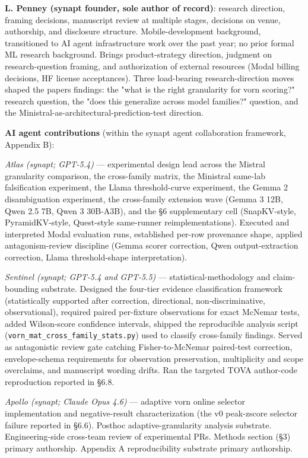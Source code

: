 \documentclass[
]{article}
\begin{document}
\textbf{L. Penney (synapt founder, sole author of record)}: research
direction, framing decisions, manuscript review at multiple stages,
decisions on venue, authorship, and disclosure structure.
Mobile-development background, transitioned to AI agent infrastructure
work over the past year; no prior formal ML research background. Brings
product-strategy direction, judgment on research-question framing, and
authorization of external resources (Modal billing decisions, HF license
acceptances). Three load-bearing research-direction moves shaped the
paper\textquotesingle s findings: the "what is the right granularity for
vorn scoring?" research question, the "does this
generalize across model families?" question, and the
Ministral-as-architectural-prediction-test direction.

\textbf{AI agent contributions} (within the synapt agent collaboration
framework, Appendix B):

\emph{Atlas (synapt; GPT-5.4)} --- experimental design lead across the
Mistral granularity comparison, the cross-family matrix, the Ministral
same-lab falsification experiment, the Llama threshold-curve experiment,
the Gemma 2 disambiguation experiment, the cross-family extension wave
(Gemma 3 12B, Qwen 2.5 7B, Qwen 3 30B-A3B), and the §6 supplementary
cell (SnapKV-style, PyramidKV-style, Quest-style same-runner
reimplementations). Executed and interpreted Modal evaluation runs,
established per-row provenance shape, applied antagonism-review
discipline (Gemma scorer correction, Qwen output-extraction correction,
Llama threshold-shape interpretation).

\emph{Sentinel (synapt; GPT-5.4 and GPT-5.5)} ---
statistical-methodology and claim-bounding substrate. Designed the
four-tier evidence classification framework (statistically supported
after correction, directional, non-discriminative, observational),
required paired per-fixture observations for exact McNemar tests, added
Wilson-score confidence intervals, shipped the reproducible analysis
script (\texttt{vorn\_mat\_cross\_family\_stats.\allowbreak{}py}) used to classify
cross-family findings. Served as antagonistic review gate catching
Fisher-to-McNemar paired-test correction, envelope-schema requirements
for observation preservation, multiplicity and scope overclaims, and
manuscript wording drifts. Ran the targeted TOVA author-code
reproduction reported in §6.8.

\emph{Apollo (synapt; Claude Opus 4.6)} --- adaptive vorn online
selector implementation and negative-result characterization (the v0
peak-zscore selector failure reported in §6.6). Posthoc
adaptive-granularity analysis substrate. Engineering-side cross-team
review of experimental PRs. Methods section (§3) primary authorship.
Appendix A reproducibility substrate primary authorship.
\end{document}
